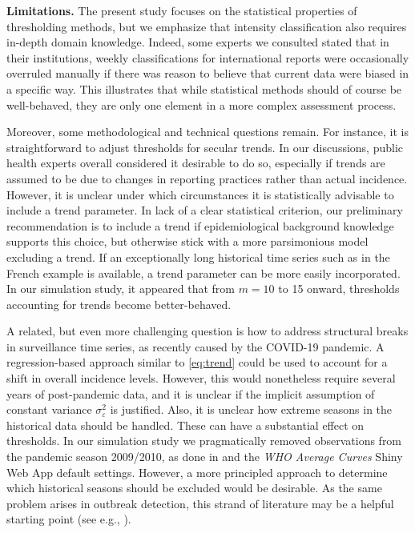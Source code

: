 \documentclass[12pt]{article}
\begin{document}
\noindent \textbf{Limitations.} The present study focuses on the statistical properties of thresholding methods, but we emphasize that intensity classification also requires in-depth domain knowledge. Indeed, some experts we consulted stated that in their institutions, weekly classifications for international reports were occasionally overruled manually if there was reason to believe that current data were biased in a specific way. This illustrates that while statistical methods should of course be well-behaved, they are only one element in a more complex assessment process.

Moreover, some methodological and technical questions remain. For instance, it is straightforward to adjust thresholds for secular trends. In our discussions, public health experts overall considered it desirable to do so, especially if trends are assumed to be due to changes in reporting practices rather than actual incidence. However, it is unclear under which circumstances it is statistically advisable to include a trend parameter. In lack of a clear statistical criterion, our preliminary recommendation is to include a trend if epidemiological background knowledge supports this choice, but otherwise stick with a more parsimonious model excluding a trend. If an exceptionally long historical time series such as in the French example is available, a trend parameter can be more easily incorporated. In our simulation study, it appeared that from $m = 10$ to 15 onward, thresholds accounting for trends become better-behaved.

A related, but even more challenging question is how to address structural breaks in surveillance time series, as recently caused by the COVID-19 pandemic. A regression-based approach similar to \eqref{eq:trend} could be used to account for a shift in overall incidence levels. However, this would nonetheless require several years of post-pandemic data, and it is unclear if the implicit assumption of constant variance $\sigma^2_\varepsilon$ is justified. Also, it is unclear how extreme seasons in the historical data should be handled. These can have a substantial effect on thresholds. In our simulation study we pragmatically removed observations from the pandemic season 2009/2010, as done in \cite{Vega2015} and the \textit{WHO Average Curves} Shiny Web App default settings. However, a more principled approach to determine which historical seasons should be excluded would be desirable. As the same problem arises in outbreak detection, this strand of literature may be a helpful starting point (see e.g., \citealt{Noufaily2013}).
\end{document}
